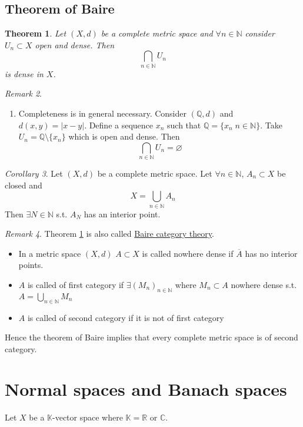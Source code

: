 \documentclass[a4paper, 12pt]{article}
\theoremstyle{plain}
\newtheorem{theorem}{Theorem}[subsection] %
\theoremstyle{definition}
\theoremstyle{lemma}
\theoremstyle{remark}
\newtheorem{remark}[theorem]{Remark}
\theoremstyle{corollary}
\newtheorem{corollary}[theorem]{Corollary}
\theoremstyle{example}
\begin{document}
	\subsection{Theorem of Baire}
	\begin{theorem}
		\label{th: baire}
		Let $(X,d)$ be a complete metric space and $\forall n \in \mathbb{N}$ consider $U_n \subset X$ open and dense. Then \[\bigcap\limits_{n \in \mathbb{N}} U_n\] is dense in $X$.
	\end{theorem}

	\begin{remark}
		\begin{enumerate}
			\item Completeness is in general necessary. Consider $(\mathbb{Q}, d)$ and $d(x,y) = \left|x-y\right|$. Define a sequence $x_n$ such that $\mathbb{Q} = \{x_n \; n \in \mathbb{N}\}$. Take $U_n = \mathbb{Q} \setminus \{x_n\}$ which is open and dense. Then \[\bigcap\limits_{n \in \mathbb{N}} U_n = \varnothing\]
		\end{enumerate}
	\end{remark}

	\begin{corollary}
		Let $(X,d)$ be a complete metric space. Let $\forall n \in \mathbb{N}$, $A_n \subset X$ be closed and \[X = \bigcup\limits_{n \in \mathbb{N}} A_n\] Then $\exists N \in \mathbb{N}$ s.t. $A_N$ has an interior point.
	\end{corollary}

	\begin{remark}
		Theorem \ref{th: baire} is also called \underline{Baire category theory}.\\
		\begin{itemize}
			\item In a metric space $(X,d)$ $A \subset X$ is called nowhere dense if $\overline{A}$ has no interior points.
			\item $A$ is called of first category if $\exists (M_n)_{n \in \mathbb{N}}$ where $M_n \subset A$ nowhere dense s.t. $A = \bigcup_{n \in \mathbb{N}} M_n$
			\item $A$ is called of second category if it is not of first category
		\end{itemize}
		Hence the theorem of Baire implies that every complete metric space is of second category.
	\end{remark}
	
	\section{Normal spaces and Banach spaces}
	Let $X$ be a $\mathbb{K}$-vector space where $\mathbb{K} = \mathbb{R}$ or $\mathbb{C}$.
\end{document}
